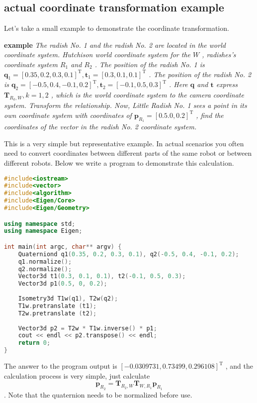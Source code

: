 \subsection{actual coordinate transformation example}

Let's take a small example to demonstrate the coordinate transformation.

\noindent  \textbf{example} \quad  \emph{The radish No. 1 and the radish No. 2 are located in the world coordinate system. Hutchison world coordinate system for the $ W $ , radishes's coordinate system $ R_ 1 $ and $ R_ 2 $ . The position of the radish No. 1 is $ \bm {q}_ 1 = [ 0.35 , 0.2 , 0.3 , 0.1 ]^ \mathrm{T}, \bm{t}_ 1 = [ 0.3 , 0.1 , 0.1 ]^ \mathrm{T} $ . The position of the radish No. 2 is $ \bm{q}_2 = [ - 0.5 , 0.4 , - 0.1 , 0.2 ]^ \mathrm{T}, \bm{t}_ 2 = [- 0.1 , 0.5 , 0.3 ]^ \mathrm{T} $ . Here $ \bm {q} $ and $ \bm{t} $ express $ \bm{T}_{R_k, W}, k= 1 , 2 $ , which is the world coordinate system to the camera coordinate system. Transform the relationship. Now, Little Radish No. 1 sees a point in its own coordinate system with coordinates of $ \bm{p}_{R_1} = [ 0.5 .0 , 0.2 ]^ \mathrm{T} $ , find the coordinates of the vector in the radish No. 2 coordinate system. }

This is a very simple but representative example. In actual scenarios you often need to convert coordinates between different parts of the same robot or between different robots. Below we write a program to demonstrate this calculation.

\begin{lstlisting}[language=c++,caption=slambook2/ch3/examples/coordinateTransform.cpp]
#include<iostream>
#include<vector>
#include<algorithm>
#include<Eigen/Core>
#include<Eigen/Geometry>

using namespace std;
using namespace Eigen;

int main(int argc, char** argv) {
    Quaterniond q1(0.35, 0.2, 0.3, 0.1), q2(-0.5, 0.4, -0.1, 0.2);
    q1.normalize();
    q2.normalize();
    Vector3d t1(0.3, 0.1, 0.1), t2(-0.1, 0.5, 0.3);
    Vector3d p1(0.5, 0, 0.2);
    
    Isometry3d T1w(q1), T2w(q2);
    T1w.pretranslate (t1);
    T2w.pretranslate (t2);
    
    Vector3d p2 = T2w * T1w.inverse() * p1;
    cout << endl << p2.transpose() << endl;
    return 0;
}
\end{lstlisting}

The answer to the program output is $ [- 0.0309731 , 0.73499 , 0.296108 ]^ \mathrm{T} $ , and the calculation process is very simple, just calculate $$ \bm{p}_{R_2} = \bm{T}_{ R_2, W} \bm{T}_{W, R_1} \bm{p}_{R_1} $$ . Note that the quaternion needs to be normalized before use.
